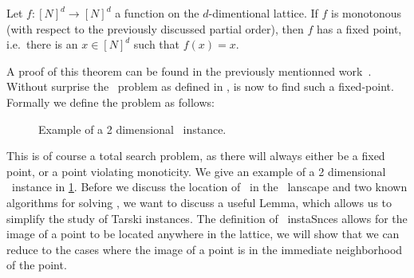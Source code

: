 \begin{theorem}
    Let $f : {[N]}^d \rightarrow {[N]}^d$ a function on the $d$-dimentional lattice. If $f$ is monotonous (with respect to the previously discussed partial order), then $f$ has a fixed point, i.e.\ there is an $x \in {[N]}^d$ such that $f(x)=x$.
\end{theorem}

A proof of this theorem can be found in the previously mentionned work~\cite{tarski_lattice-theoretical_1955}. Without surprise the \Tarski\ problem as defined in , is now to find such a fixed-point. Formally we define the problem as follows:

\begin{figure}
    \centering
    \caption[Example of a \Tarski\ instance]{Example of a 2 dimensional \Tarski\ instance.}
    \label{fig:tarski_example}
\end{figure}

This is of course a total search problem, as there will always either be a fixed point, or a point violating monoticity. We give an example of a 2 dimensional \Tarski\ instance in \cref{fig:tarski_example}. Before we discuss the location of \Tarski\ in the \TFNP\ lanscape and two known algorithms for solving \Tarski, we want to discuss a useful Lemma, which allows us to simplify the study of Tarski instances. The definition of \Tarski\ instaSnces allows for the image of a point to be located anywhere in the lattice, we will show that we can reduce to the cases where the image of a point is in the immediate neighborhood of the point.

